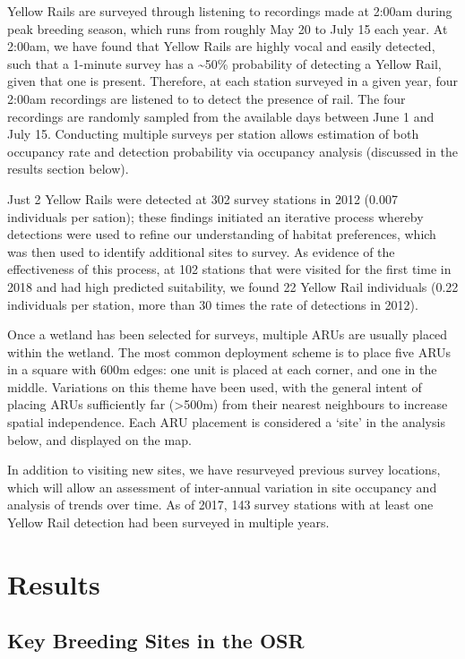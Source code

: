 \documentclass[11pt,]{article}
\begin{document}
Yellow Rails are surveyed through listening to recordings made at 2:00am
during peak breeding season, which runs from roughly May 20 to July 15
each year. At 2:00am, we have found that Yellow Rails are highly vocal
and easily detected, such that a 1-minute survey has a
\textasciitilde{}50\% probability of detecting a Yellow Rail, given that
one is present. Therefore, at each station surveyed in a given year,
four 2:00am recordings are listened to to detect the presence of rail.
The four recordings are randomly sampled from the available days between
June 1 and July 15. Conducting multiple surveys per station allows
estimation of both occupancy rate and detection probability via
occupancy analysis (discussed in the results section below).

Just 2 Yellow Rails were detected at 302 survey stations in 2012 (0.007
individuals per sation); these findings initiated an iterative process
whereby detections were used to refine our understanding of habitat
preferences, which was then used to identify additional sites to survey.
As evidence of the effectiveness of this process, at 102 stations that
were visited for the first time in 2018 and had high predicted
suitability, we found 22 Yellow Rail individuals (0.22 individuals per
station, more than 30 times the rate of detections in 2012).

Once a wetland has been selected for surveys, multiple ARUs are usually
placed within the wetland. The most common deployment scheme is to place
five ARUs in a square with 600m edges: one unit is placed at each
corner, and one in the middle. Variations on this theme have been used,
with the general intent of placing ARUs sufficiently far
(\textgreater{}500m) from their nearest neighbours to increase spatial
independence. Each ARU placement is considered a `site' in the analysis
below, and displayed on the map.

In addition to visiting new sites, we have resurveyed previous survey
locations, which will allow an assessment of inter-annual variation in
site occupancy and analysis of trends over time. As of 2017, 143 survey
stations with at least one Yellow Rail detection had been surveyed in
multiple years.

\section{Results}\label{results}

\subsection{Key Breeding Sites in the
OSR}\label{key-breeding-sites-in-the-osr}
\end{document}
